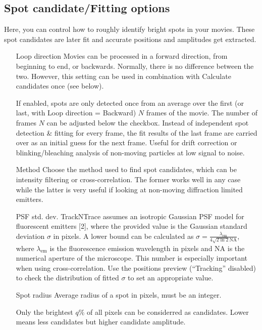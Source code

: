 \documentclass[11pt,onside]{report}
\makeatletter
\numberwithin{equation}{chapter}
\gdef\tshortstack{\@ifnextchar[\@tshortstack{\@tshortstack[c]}}
\gdef\@tshortstack[#1]{%
  \leavevmode
  \vtop\bgroup
    \baselineskip-\p@\lineskip 3\p@
    \let\mb@l\hss\let\mb@r\hss
    \expandafter\let\csname mb@#1\endcsname\relax
    \let\\\@stackcr
    \@ishortstack}
\makeatother
\begin{document}
\subsection*{Spot candidate/Fitting options}
Here, you can control how to roughly identify bright spots in your movies. These spot candidates are later fit and accurate positions and amplitudes get extracted. 
\begin{itemize}[leftmargin=2cm]
\item[Loop direction] Movies can be processed in a forward direction, from beginning to end, or backwards. Normally, there is no difference between the two. However, this setting can be used in combination with \textsf{Calculate candidates once} (see below).
\item[\smash{\tshortstack[1]{Calculate candi-\\dates once}}] If enabled, spots are only detected once from an average over the first (or last, with \textsf{Loop direction = Backward}) $N$ frames of the movie. The number of frames $N$ can be adjusted below the checkbox. Instead of independent spot detection \& fitting for every frame, the fit results of the last frame are carried over as an initial guess for the next frame. Useful for drift correction or blinking/bleaching analysis of non-moving particles at low signal to noise.
\item[Method] Choose the method used to find spot candidates, which can be intensity filtering or cross-correlation. The former works well in any case while the latter is very useful if looking at non-moving diffraction limited emitters.
\item[PSF std. dev.] TrackNTrace assumes an isotropic Gaussian PSF model for fluorescent emitters [2], where the provided value is the Gaussian standard deviation $\sigma$ in pixels. A lower bound can be calculated as $\sigma = \frac{\lambda_\mathrm{em}}{4\sqrt{2\ln 2} \mathrm{NA}}$, where $\lambda_\mathrm{em}$ is the fluorescence emission wavelength in pixels and NA is the numerical aperture of the microscope. This number is especially important when using cross-correlation. Use the positions preview (``Tracking'' disabled) to check the distribution of fitted $\sigma$ to set an appropriate value.
\item[Spot radius] Average radius of a spot in pixels, must be an integer.
\item[\smash{\tshortstack[1]{Percent brightest\\ pixels}}] Only the brightest $q\%$ of all pixels can be considerred as candidates. Lower means less candidates but higher candidate amplitude.

\end{itemize}
\end{document}
